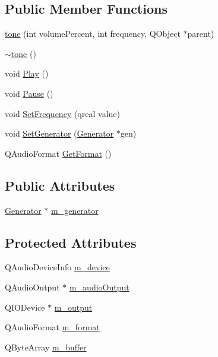 \subsection*{Public Member Functions}
\begin{DoxyCompactItemize}
\item 
\hyperlink{classtone_a55857617243689a5addf2fccb1bfc345}{tone} (int volume\-Percent, int frequency, Q\-Object $\ast$parent)
\item 
\hyperlink{classtone_a2c9ba517884577f4ceb2a15be1a1ac1d}{$\sim$tone} ()
\item 
void \hyperlink{classtone_ab7c8d92a1041eefbd592f6388c288dc5}{Play} ()
\item 
void \hyperlink{classtone_ad06ca335937de129036a7e79a283f3dd}{Pause} ()
\item 
void \hyperlink{classtone_a989956fe95107f983464d2ac01b19211}{Set\-Frequency} (qreal value)
\item 
void \hyperlink{classtone_a241f1871559d339fbdec300dd20da887}{Set\-Generator} (\hyperlink{class_generator}{Generator} $\ast$gen)
\item 
Q\-Audio\-Format \hyperlink{classtone_a6f02a174da735dc0947ac4bf151d9012}{Get\-Format} ()
\end{DoxyCompactItemize}
\subsection*{Public Attributes}
\begin{DoxyCompactItemize}
\item 
\hyperlink{class_generator}{Generator} $\ast$ \hyperlink{classtone_aa49c08b076903abdbf974444a0efa2b7}{m\-\_\-generator}
\end{DoxyCompactItemize}
\subsection*{Protected Attributes}
\begin{DoxyCompactItemize}
\item 
Q\-Audio\-Device\-Info \hyperlink{classtone_ab3c3b5206828b0629a37174ba3b098b1}{m\-\_\-device}
\item 
Q\-Audio\-Output $\ast$ \hyperlink{classtone_a8d4a0b1f0f2a3b05fcd580d29e6c7feb}{m\-\_\-audio\-Output}
\item 
Q\-I\-O\-Device $\ast$ \hyperlink{classtone_a97ac901b1b1e269ee5eb719e667485d3}{m\-\_\-output}
\item 
Q\-Audio\-Format \hyperlink{classtone_a556b7109c6895b2c5a3d011145a80952}{m\-\_\-format}
\item 
Q\-Byte\-Array \hyperlink{classtone_a9f2508fefb9803b27bb08276369e2036}{m\-\_\-buffer}
\end{DoxyCompactItemize}


